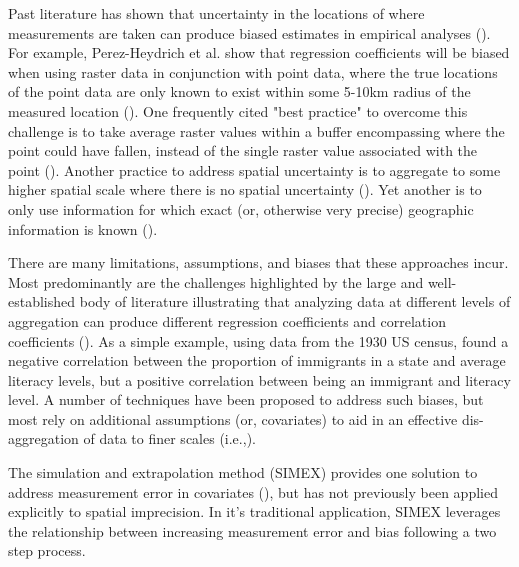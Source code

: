 Past literature has shown that uncertainty in the locations of where measurements are taken can produce biased estimates in empirical analyses (\cite{perez-heydrich_guidelines_2013,rettie_overcoming_1999}). 
For example, Perez-Heydrich et al. show that regression coefficients will be biased when using raster data in conjunction with point data, where the true locations of the point data are only known to exist within some 5-10km radius of the measured location (\cite{perez-heydrich_guidelines_2013}). 
One frequently cited "best practice" to overcome this challenge is to take average raster values within a buffer encompassing where the point could have fallen, instead of the single raster value associated with the point (\cite{perez-heydrich_guidelines_2013, rettie_overcoming_1999}). 
Another practice to address spatial uncertainty is to aggregate to some higher spatial scale where there is no spatial uncertainty (\cite{perez-heydrich_guidelines_2013}). 
Yet another is to only use information for which exact (or, otherwise very precise) geographic information is known (\cite{runfola_migration_2016,dreher_aid_2015}).
\par
There are many limitations, assumptions, and biases that these approaches incur.
Most predominantly are the challenges highlighted by the large and well-established body of literature illustrating that analyzing data at different levels of aggregation can produce different regression coefficients and correlation coefficients (\cite{clark_effects_1976, selvin_durkheims_1958, gotway_combining_2002, gehlke_certain_1934, cramer_efficient_1964}). 
As a simple example, using data from the 1930 US census, \cite{robinson_ecological_2009} found a negative correlation between the proportion of immigrants in a state and average literacy levels, but a positive correlation between being an immigrant and literacy level. 
A number of techniques have been proposed to address such biases, but most rely on additional assumptions (or, covariates) to aid in an effective dis-aggregation of data to finer scales (i.e.,\cite{gotway_combining_2002, zhu_combined_2004,oloughlin_can_2000,wong_modifiable_2004}).
\par
The simulation and extrapolation method (SIMEX) provides one solution to address measurement error in covariates (\cite{wang_bias_1998,kuchenhoff_general_2006,li_functional_2003}), but has not previously been applied explicitly to spatial imprecision. 
In it's traditional application, SIMEX leverages the relationship between increasing measurement error and bias following a two step process. 
